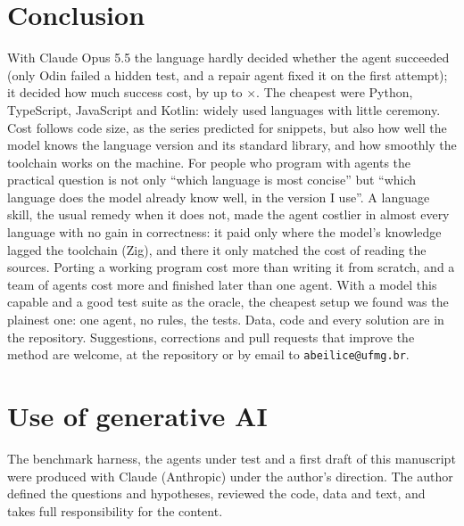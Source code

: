 \documentclass[11pt,a4paper]{article}
\begin{document}
\section{Conclusion}

With Claude Opus 5.5 the language hardly decided whether the agent succeeded (only Odin failed a hidden
test, and a repair agent fixed it on the first attempt); it decided how much success cost, by up to
\RatioAsm$\times$. The cheapest were Python, TypeScript, JavaScript and Kotlin: widely used languages with little
ceremony. Cost follows code size, as the series predicted for snippets,
but also how well the model knows the language version and its standard library, and how smoothly the
toolchain works on the machine. For people who program
with agents the practical question is not only ``which language is most concise'' but ``which language
does the model already know well, in the version I use''. A language skill, the usual remedy when it
does not, made the agent costlier in almost every language with no gain in correctness: it paid only
where the model's knowledge lagged the toolchain (Zig), and there it only matched the cost of reading the
sources. Porting a working program cost more than writing it from scratch, and a team of agents cost more and
finished later than one agent. With a model this capable and a good test suite as the oracle, the cheapest
setup we found was the plainest one: one agent, no rules, the tests. Data, code and every solution are in the
repository. Suggestions, corrections and pull requests that improve the method are welcome, at the
repository or by email to \texttt{abeilice@ufmg.br}.

\section*{Use of generative AI}

The benchmark harness, the agents under test and a first draft of this manuscript were produced with
Claude (Anthropic) under the author's direction. The author defined the questions and hypotheses,
reviewed the code, data and text, and takes full responsibility for the content.
\end{document}
